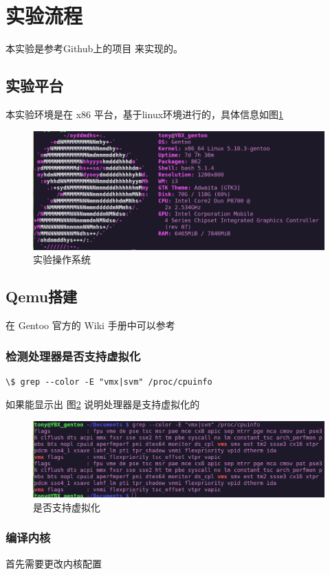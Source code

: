 \section{实验流程}
本实验是参考Github上的项目 \cite{BusyBear} 来实现的。

\subsection{实验平台}
本实验环境是在 x86 平台，基于linux环境进行的，具体信息如图\ref{fig:gentoo} 

\begin{figure}[htbp]
  \centering %
  \includegraphics[width=0.6 \textwidth]{figs/gentoo_Logo.eps}
  \caption{实验操作系统}
  \label{fig:gentoo} %
\end{figure}

\subsection{Qemu搭建}
在 Gentoo 官方的 Wiki 手册中可以参考 \cite{GentooQemu}
\subsubsection{检测处理器是否支持虚拟化}
\begin{lstlisting}
\$ grep --color -E "vmx|svm" /proc/cpuinfo 
\end{lstlisting}
如果能显示出 图\ref{fig:vmx_svm} 说明处理器是支持虚拟化的

\begin{figure}[htbp]
  \centering %
  \includegraphics[width=0.6 \textwidth]{figs/vmx_svm.eps}
  \caption{是否支持虚拟化}
  \label{fig:vmx_svm} %
\end{figure}

\subsubsection{编译内核}
首先需要更改内核配置

